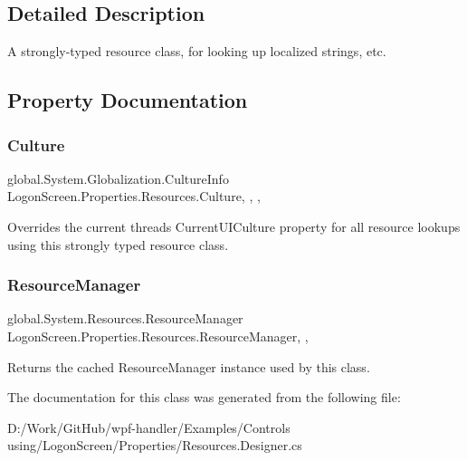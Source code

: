 \subsection{Detailed Description}
A strongly-\/typed resource class, for looking up localized strings, etc. 



\subsection{Property Documentation}
\mbox{\label{class_logon_screen_1_1_properties_1_1_resources_a2a86426313872aabb7d371e2f1e5f67f}} 
\subsubsection{\texorpdfstring{Culture}{Culture}}
{\footnotesize\ttfamily global.\+System.\+Globalization.\+Culture\+Info Logon\+Screen.\+Properties.\+Resources.\+Culture\hspace{0.3cm}{\ttfamily [static]}, {\ttfamily [get]}, {\ttfamily [set]}, {\ttfamily [package]}}



Overrides the current thread\textquotesingle{}s Current\+U\+I\+Culture property for all resource lookups using this strongly typed resource class. 

\mbox{\label{class_logon_screen_1_1_properties_1_1_resources_ac2325a4e59a494a4509c16712905b0c2}} 
\subsubsection{\texorpdfstring{Resource\+Manager}{ResourceManager}}
{\footnotesize\ttfamily global.\+System.\+Resources.\+Resource\+Manager Logon\+Screen.\+Properties.\+Resources.\+Resource\+Manager\hspace{0.3cm}{\ttfamily [static]}, {\ttfamily [get]}, {\ttfamily [package]}}



Returns the cached Resource\+Manager instance used by this class. 



The documentation for this class was generated from the following file\+:\begin{DoxyCompactItemize}
\item 
D\+:/\+Work/\+Git\+Hub/wpf-\/handler/\+Examples/\+Controls using/\+Logon\+Screen/\+Properties/Resources.\+Designer.\+cs\end{DoxyCompactItemize}
